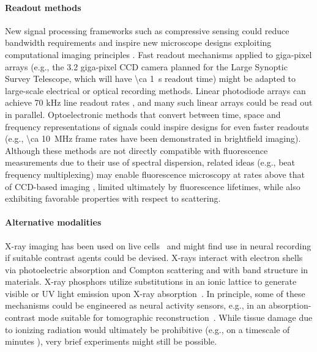 \paragraph{Readout methods} New signal processing frameworks such as compressive sensing could reduce bandwidth requirements and inspire new microscope designs exploiting computational imaging principles \cite{raskar2009computational, velten2012recovering, kim2010next, pnevmatikakissparse}. Fast readout mechanisms \cite{lauxtermann2001mega} applied to giga-pixel arrays (e.g., the 3.2 giga-pixel CCD camera planned for the Large Synoptic Survey Telescope, which will have \SI{\ca 1}{\second} readout time) might be adapted to large-scale electrical or optical recording methods. Linear photodiode arrays can achieve 70 kHz line readout rates \cite{PSeriesLinearArrayImager}, and many such linear arrays could be read out in parallel. Optoelectronic methods that convert between time, space and frequency representations of signals \cite{goda2012high, goda2009serial, goda2008amplified, goda2009theory, mahjoubfar2011high, tsia2010performance, goda2013dispersive} could inspire designs for even faster readouts (e.g., \SI{\ca 10}{\mega\hertz} frame rates have been demonstrated in brightfield imaging). Although these methods are not directly compatible with fluorescence measurements due to their use of spectral dispersion, related ideas (e.g., beat frequency multiplexing) may enable fluorescence microscopy at rates above that of CCD-based imaging \cite{diebold2013digitally, ducros2013encoded}, limited ultimately by fluorescence lifetimes, while also exhibiting favorable properties with respect to scattering.

\paragraph{Alternative modalities} X-ray imaging has been used on live cells~\cite{moosmann13} and might find use in neural recording if suitable contrast agents could be devised.
X-rays interact with electron shells via photoelectric absorption and Compton scattering and with band structure in materials.
X-ray phosphors utilize substitutions in an ionic lattice to generate visible or UV light emission upon X-ray absorption~\cite{issler95}.
In principle, some of these mechanisms could be engineered as neural activity sensors, e.g., in an absorption-contrast mode suitable for tomographic reconstruction~\cite{larabell04}. While tissue damage due to ionizing radiation would ultimately be prohibitive (e.g., on a timescale of minutes \cite{WoodPersonalCommunication}), very brief experiments might still be possible.

